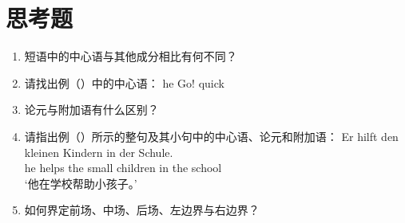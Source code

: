







\section*{思考题}

\begin{enumerate}
\item 短语中的中心语与其他成分相比有何不同？
\item 请找出例（）中的中心语：
      \eal
      \ex he
      \ex Go!
      \ex quick
      \zl
\item 论元与附加语有什么区别？
\item 请指出例（）所示的整句及其小句中的中心语、论元和附加语：
  \ea
	\gll Er hilft den kleinen Kindern in der Schule.\\
		 he helps the small children in the school\\
	\glt `他在学校帮助小孩子。' 
  \z

\item 如何界定前场、中场、后场、左边界与右边界？
\end{enumerate}

